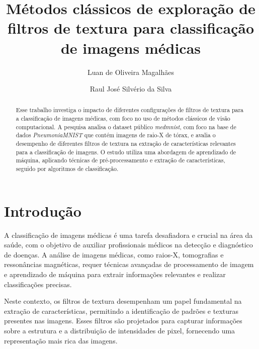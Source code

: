 \documentclass[sigconf,nonacm]{acmart}
\begin{document}
\title{Métodos clássicos de exploração de filtros de textura para classificação de imagens médicas}


\author{Luan de Oliveira Magalhães}

\author{Raul José Silvério da Silva}

\begin{abstract}
  Esse trabalho investiga o impacto de diferentes configurações de filtros de textura para a classificação de imagens médicas, com foco no uso de métodos clássicos de visão computacional.
  A pesquisa analisa o dataset público \textit{medmnist}, com foco na base de dados \textit{PneumoniaMNIST} que contém imagens de raio-X de tórax, e avalia o desempenho de diferentes filtros de textura na extração de características relevantes para a classificação de imagens.
  O estudo utiliza uma abordagem de aprendizado de máquina, aplicando técnicas de pré-processamento e extração de características, seguido por algoritmos de classificação.
\end{abstract}


\maketitle

\section{Introdução}
A classificação de imagens médicas é uma tarefa desafiadora e crucial na área da saúde, com o objetivo de auxiliar profissionais médicos na detecção e diagnóstico de doenças. A análise de imagens médicas, como raios-X, tomografias e ressonâncias magnéticas, requer técnicas avançadas de processamento de imagem e aprendizado de máquina para extrair informações relevantes e realizar classificações precisas.

Neste contexto, os filtros de textura desempenham um papel fundamental na extração de características, permitindo a identificação de padrões e texturas presentes nas imagens. Esses filtros são projetados para capturar informações sobre a estrutura e a distribuição de intensidades de pixel, fornecendo uma representação mais rica das imagens.
\end{document}
